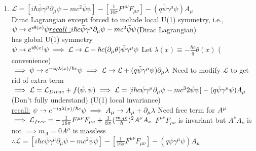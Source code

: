\documentclass[12pt]{amsart}
\begin{document}
\begin{enumerate}
\item \underline{$\mathcal{L} = [i \hbar \bar{\psi} \gamma^{\mu} \partial_{\mu} \psi - m c^2 \bar{\psi} \psi] - [ \frac{1}{16 \pi} F^{\mu \nu} F_{\mu \nu} ] - ( q \bar{\psi} \gamma^{\mu} \psi) A_{\mu}$}\\
Dirac Lagrangian except forced to include local U(1) symmetry, i.e., $\psi \rightarrow e^{i \theta (x)} \psi\\
\underline{recall:} i \hbar c \bar{\psi} \gamma^{\mu} \partial_{\mu} \psi - m c^2 \bar{\psi} \psi $(Dirac Lagrangian)\\
has global U(1) symmetry\\
$\psi \rightarrow e^{i \theta (x)} \psi \implies \mathcal{L} \rightarrow \mathcal{L} - \hbar c ( \partial_{\mu} \theta) \bar{\psi} \gamma^{\mu} \psi\\$
Let $\lambda(x) \equiv - \frac{\hbar c}{q} \theta(x)$ ( convenience)\\
$\implies \psi \rightarrow e^{-i q \lambda(x)/ \hbar c} \psi \implies \mathcal{L} \rightarrow \mathcal{L} + ( q \bar{\psi} \gamma^{\mu} \psi) \partial_{\mu} \lambda\\$
Need to modify $\mathcal{L}$ to get rid of extra term\\
$\implies \mathcal{L} = \mathcal{L}_{Dirac} + f(\bar{\psi}, \psi)\\
\implies \mathcal{L} = [ i \hbar c \bar{\psi} \gamma^{\mu} \partial_{\mu} \psi - m c^32 \bar{\psi} \psi ] - ( q \bar{\psi} \gamma^{\mu} \psi) A_{\mu}\\$
(Don't fully understand) (U(1) local invariance)\\
\underline{recall:} $\psi \rightarrow e^{-i q \lambda(x)/\hbar c} \psi \implies A_{\mu} \rightarrow A_{\mu} + \partial_{\mu} \lambda\\$
Need free term for $A^{\mu}\\$
$\implies \mathcal{L}_{free} = - \frac{1}{16 \pi} F^{\mu \nu} F_{\mu \nu} + \frac{1}{8 \pi} ( \frac{m_A c}{\hbar})^2 A^{\nu} A_{\nu}\\$
$F^{\mu \nu} F_{\mu \nu}$ is invariant but $A^{\nu} A_{\nu}$ is not $\implies m_A = 0 A^{\mu}$ is massless\\
$\therefore \mathcal{L} = [i \hbar c \bar{\psi} \gamma^{\mu} \partial_{\mu} \psi - m c^2 \bar{\psi} \psi] - [ \frac{1}{16 \pi} F^{\mu \nu} F_{\mu \nu} ] - ( q \bar{\psi} \gamma^{\mu} \psi) A_{\mu}$\\


\hdashrule[0.5ex][c]{\linewidth}{0.5pt}{1.5mm}



\end{enumerate}
\end{document}
